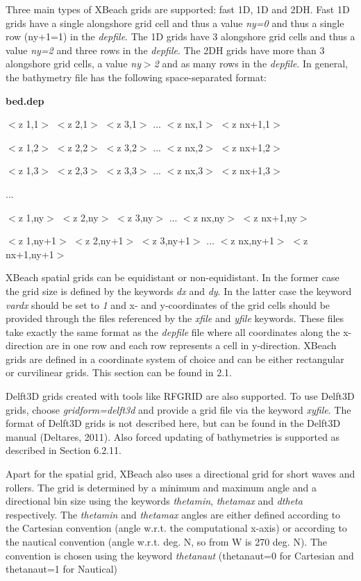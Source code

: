 \documentclass{article}
\begin{document}
\noindent Three main types of XBeach grids are supported: fast 1D, 1D and 2DH. Fast 1D grids have a single alongshore grid cell and thus a value \textit{ny=0 }and thus a single row (ny+1=1) in the \textit{depfile}. The 1D grids have 3 alongshore grid cells and thus a value \textit{ny=2 }and three rows in the \textit{depfile}. The 2DH grids have more than 3 alongshore grid cells, a value \textit{ny$>$2} and as many rows in the \textit{depfile}. In general, the bathymetry file has the following space-separated format:

\noindent \textbf{bed.dep}

\noindent $<$z 1,1$>$ $<$z 2,1$>$ $<$z 3,1$>$ ... $<$z nx,1$>$ $<$z nx+1,1$>$

\noindent $<$z 1,2$>$ $<$z 2,2$>$ $<$z 3,2$>$ ... $<$z nx,2$>$ $<$z nx+1,2$>$

\noindent $<$z 1,3$>$ $<$z 2,3$>$ $<$z 3,3$>$ ... $<$z nx,3$>$ $<$z nx+1,3$>$

\noindent ...

\noindent $<$z 1,ny$>$ $<$z 2,ny$>$ $<$z 3,ny$>$ ... $<$z nx,ny$>$ $<$z nx+1,ny$>$

\noindent $<$z 1,ny+1$>$ $<$z 2,ny+1$>$ $<$z 3,ny+1$>$ ... $<$z nx,ny+1$>$ $<$z nx+1,ny+1$>$

\noindent XBeach spatial grids can be equidistant or non-equidistant. In the former case the grid size is defined by the keywords \textit{dx} and \textit{dy}. In the latter case the keyword \textit{vardx} should be set to \textit{1} and x- and y-coordinates of the grid cells should be provided through the files referenced by the \textit{xfile }and \textit{yfile} keywords. These files take exactly the same format as the \textit{depfile} file where all coordinates along the x-direction are in one row and each row represents a cell in y-direction. XBeach grids are defined in a coordinate system of choice and can be either rectangular or curvilinear grids. This section can be found in 2.1.

\noindent Delft3D grids created with tools like RFGRID are also supported. To use Delft3D grids, choose \textit{gridform=delft3d} and provide a grid file via the keyword \textit{xyfile}. The format of Delft3D grids is not described here, but can be found in the Delft3D manual (Deltares, 2011). Also forced updating of bathymetries is supported as described in Section 6.2.11.

\noindent Apart for the spatial grid, XBeach also uses a directional grid for short waves and rollers. The grid is determined by a minimum and maximum angle and a directional bin size using the keywords \textit{thetamin}, \textit{thetamax} and \textit{dtheta} respectively. The \textit{thetamin} and \textit{thetamax} angles are either defined according to the Cartesian convention (angle w.r.t. the computational x-axis) or according to the nautical convention (angle w.r.t. deg. N, so from W is 270 deg. N). The convention is chosen using the keyword \textit{thetanaut} (thetanaut=0 for Cartesian and thetanaut=1 for Nautical)
\end{document}

